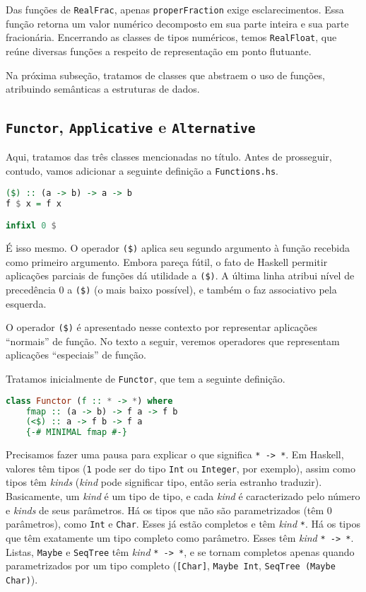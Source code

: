 \documentclass[a4paper]{article}
\begin{document}
Das funções de \texttt{RealFrac}, apenas \texttt{properFraction} exige esclarecimentos.
Essa função retorna um valor numérico decomposto em sua parte inteira e sua parte fracionária.
Encerrando as classes de tipos numéricos, temos \texttt{RealFloat}, que reúne diversas funções a respeito de representação em ponto flutuante.

Na próxima subseção, tratamos de classes que abstraem o uso de funções, atribuindo semânticas a estruturas de dados.

\subsection{\texttt{Functor}, \texttt{Applicative} e \texttt{Alternative}}

Aqui, tratamos das três classes mencionadas no título.
Antes de prosseguir, contudo, vamos adicionar a seguinte definição a \texttt{Functions.hs}.

\begin{lstlisting}[language=haskell, frame=single]
($) :: (a -> b) -> a -> b
f $ x = f x

infixl 0 $
\end{lstlisting}

É isso mesmo.
O operador \texttt{(\$)} aplica seu segundo argumento à função recebida como primeiro argumento.
Embora pareça fútil, o fato de Haskell permitir aplicações parciais de funções dá utilidade a \texttt{(\$)}.
A última linha atribui nível de precedência 0 a \texttt{(\$)} (o mais baixo possível), e também o faz associativo pela esquerda.

O operador \texttt{(\$)} é apresentado nesse contexto por representar aplicações ``normais'' de função.
No texto a seguir, veremos operadores que representam aplicações ``especiais'' de função.

Tratamos inicialmente de \texttt{Functor}, que tem a seguinte definição.

\begin{lstlisting}[language=haskell, frame=single]
class Functor (f :: * -> *) where
	fmap :: (a -> b) -> f a -> f b
	(<$) :: a -> f b -> f a
	{-# MINIMAL fmap #-}
\end{lstlisting}

Precisamos fazer uma pausa para explicar o que significa \texttt{* -> *}.
Em Haskell, valores têm tipos (\texttt{1} pode ser do tipo \texttt{Int} ou \texttt{Integer}, por exemplo), assim como tipos têm \emph{kinds} (\emph{kind} pode significar tipo, então seria estranho traduzir).
Basicamente, um \emph{kind} é um tipo de tipo, e cada \emph{kind} é caracterizado pelo número e \emph{kinds} de seus parâmetros.
Há os tipos que não são parametrizados (têm 0 parâmetros), como \texttt{Int} e \texttt{Char}.
Esses já estão completos e têm \emph{kind} \texttt{*}.
Há os tipos que têm exatamente um tipo completo como parâmetro.
Esses têm \emph{kind} \texttt{* -> *}.
Listas, \texttt{Maybe} e \texttt{SeqTree} têm \emph{kind} \mbox{\texttt{* -> *}}, e se tornam completos apenas quando parametrizados por um tipo completo (\texttt{[Char]}, \texttt{Maybe Int}, \texttt{SeqTree (Maybe Char)}).
\end{document}
